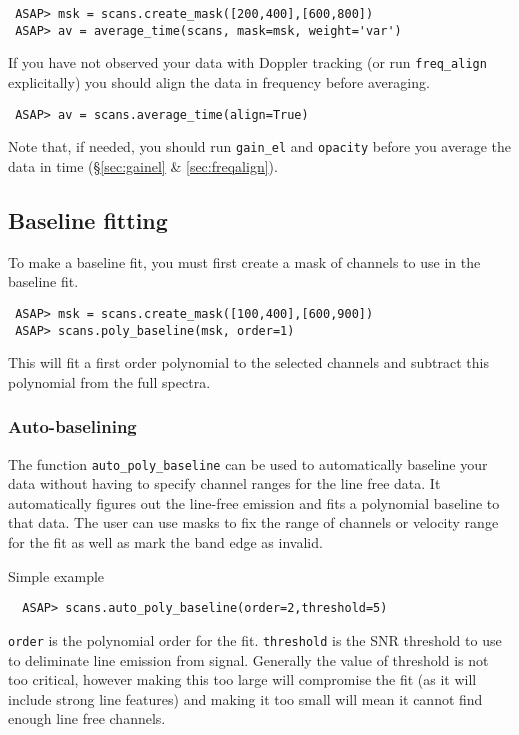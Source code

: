 \documentclass[11pt]{article}
\newcommand{\cmd}[1]{{\tt #1}}
\begin{document}
\begin{verbatim}
 ASAP> msk = scans.create_mask([200,400],[600,800])
 ASAP> av = average_time(scans, mask=msk, weight='var')
\end{verbatim}

If you have not observed your data with Doppler tracking (or run
\cmd{freq\_align} explicitally) you should align the data in frequency
before averaging.

\begin{verbatim}
 ASAP> av = scans.average_time(align=True)
\end{verbatim}

Note that, if needed, you should run \cmd{gain\_el} and \cmd{opacity}
before you average the data in time (\S \ref{sec:gainel} \&
\ref{sec:freqalign}).

\subsection{Baseline fitting}

To make a baseline fit, you must first create
a mask of channels to use in the baseline fit.

\begin{verbatim}
 ASAP> msk = scans.create_mask([100,400],[600,900])
 ASAP> scans.poly_baseline(msk, order=1)
\end{verbatim}

This will fit a first order polynomial to the selected channels and subtract
this polynomial from the full spectra.

\subsubsection{Auto-baselining}

The function \cmd{auto\_poly\_baseline} can be used to automatically
baseline your data without having to specify channel ranges for the
line free data. It automatically figures out the line-free emission
and fits a polynomial baseline to that data. The user can use masks to
fix the range of channels or velocity range for the fit as well as
mark the band edge as invalid.

Simple example

\begin{verbatim}
  ASAP> scans.auto_poly_baseline(order=2,threshold=5)
\end{verbatim}

\cmd{order} is the polynomial order for the fit. \cmd{threshold} is
the SNR threshold to use to deliminate line emission from
signal. Generally the value of threshold is not too critical, however
making this too large will compromise the fit (as it will include
strong line features) and making it too small will mean it cannot find
enough line free channels.
\end{document}
